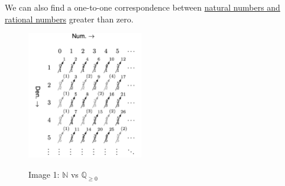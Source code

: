 \documentclass[12pt, letterpaper]{article}
\begin{document}
We can also find a one-to-one correspondence between \underline{natural numbers and rational numbers} greater than zero.\\
\begin{figure}[h]
    \centering
    \includegraphics[width=0.45\textwidth]{images/naturalvsrational.png}\\
    \caption{Image 1: \( \mathbb{N} \) vs \( \mathbb{Q}_{\geq 0} \)}
    \label{fig: image1}
\end{figure}
\pagebreak
\end{document}
